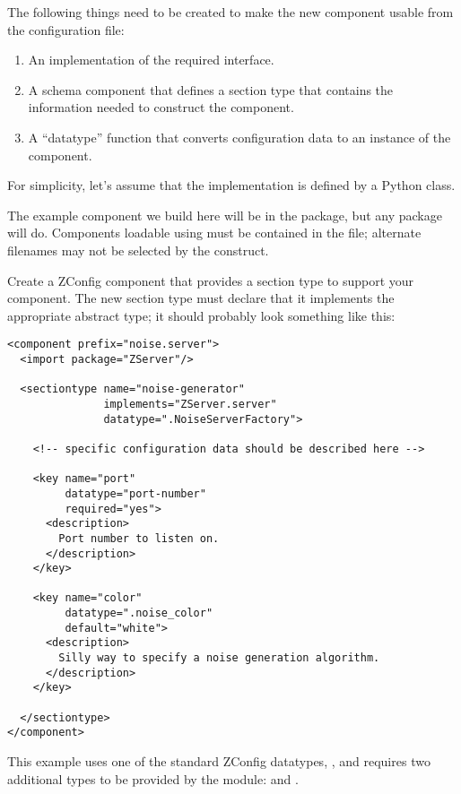 \documentclass{howto}
\newcommand{\datatype}[1]{\strong{#1}}
\begin{document}
The following things need to be created to make the new component
usable from the configuration file:

\begin{enumerate}
  \item An implementation of the required interface.

  \item A schema component that defines a section type that contains
        the information needed to construct the component.

  \item A ``datatype'' function that converts configuration data to an
        instance of the component.
\end{enumerate}

For simplicity, let's assume that the implementation is defined by a
Python class.

The example component we build here will be in the 
package, but any package will do.  Components loadable using
 must be contained in the  file;
alternate filenames may not be selected by the 
construct.

Create a ZConfig component that provides a section type to support
your component.  The new section type must declare that it implements
the appropriate abstract type; it should probably look something like
this:

\begin{verbatim}
<component prefix="noise.server">
  <import package="ZServer"/>

  <sectiontype name="noise-generator"
               implements="ZServer.server"
               datatype=".NoiseServerFactory">

    <!-- specific configuration data should be described here -->

    <key name="port"
         datatype="port-number"
         required="yes">
      <description>
        Port number to listen on.
      </description>
    </key>

    <key name="color"
         datatype=".noise_color"
         default="white">
      <description>
        Silly way to specify a noise generation algorithm.
      </description>
    </key>

  </sectiontype>
</component>
\end{verbatim}

This example uses one of the standard ZConfig datatypes,
\datatype{port-number}, and requires two additional types to be
provided by the  module:
 and .
\end{document}
